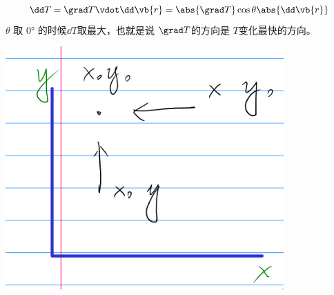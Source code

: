 \begin{equation*}
	\dd T
	=
	\grad T \vdot \dd \vb{r}
	=
	\abs{\grad T}  \cos \theta \abs{\dd \vb{r} }
\end{equation*}
\( \theta \) 取 \ang{0} 的时候\( \dd T \)取最大，也就是说 \( \grad T \)的方向是 \( T \)变化最快的方向。

\begin{marginfigure}
	\includegraphics[width=0.8\textwidth]{figures/2021-09-09T203722+0800.png}
\end{marginfigure}
